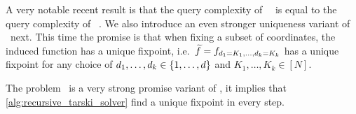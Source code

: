 
A very notable recent result is that the query complexity of \SuperUniqueTarski\, \UniqueTarski\ is equal to the query complexity of \Tarski~.  We also introduce an even stronger uniqueness variant of \Tarski\ next. This time the promise is that when fixing a subset of coordinates, the induced function has a unique fixpoint, i.e.\ $\widetilde{f} = f_{d_1=K_1, \dots, d_k=K_k}$ has a unique fixpoint for any choice of $d_1, \dots, d_k \in \left\{1, \dots, d\right\}$ and $K_1, \dots, K_k \in [N]$.


The problem \SuperUniqueTarski\ is a very strong promise variant of \Tarski, it implies that \cref{alg:recursive_tarski_solver} find a unique fixpoint in every step.